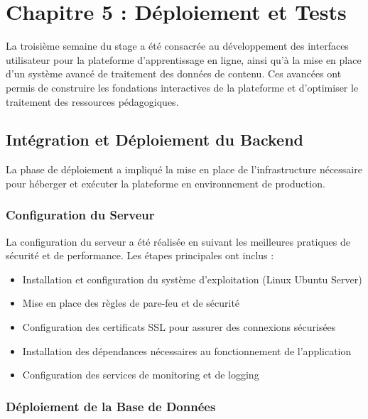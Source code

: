 \chapter*{Chapitre 5 : Déploiement et Tests}
\thispagestyle{fancy}
\setcounter{section}{0}
\newpage

La troisième semaine du stage a été consacrée au développement des interfaces utilisateur pour la plateforme d'apprentissage en ligne, ainsi qu'à la mise en place d'un système avancé de traitement des données de contenu. Ces avancées ont permis de construire les fondations interactives de la plateforme et d'optimiser le traitement des ressources pédagogiques.

\section{Intégration et Déploiement du Backend}

La phase de déploiement a impliqué la mise en place de l'infrastructure nécessaire pour héberger et exécuter la plateforme en environnement de production.

\subsection{Configuration du Serveur}

La configuration du serveur a été réalisée en suivant les meilleures pratiques de sécurité et de performance. Les étapes principales ont inclus :

\begin{itemize}
  \item Installation et configuration du système d'exploitation (Linux Ubuntu Server)
  \item Mise en place des règles de pare-feu et de sécurité
  \item Configuration des certificats SSL pour assurer des connexions sécurisées
  \item Installation des dépendances nécessaires au fonctionnement de l'application
  \item Configuration des services de monitoring et de logging
\end{itemize}

\subsection{Déploiement de la Base de Données}

